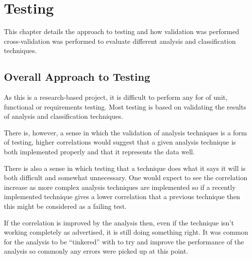 \chapter{Testing}



This chapter details the approach to testing and how validation was performed cross-validation was
performed to evaluate different analysis and classification techniques.

\section{Overall Approach to Testing}
As this is a research-based project, it is difficult to perform any for of unit, functional or 
requirements testing. Most testing is based on validating the results of analysis and 
classification techniques.

There is, however, a sense in which the validation of analysis techniques is a form of testing,
higher correlations would suggest that a given analysis technique is both implemented properly and
that it represents the data well.

There is also a sense in which testing that a technique does what it says it will is both 
difficult and somewhat unnecessary. One would expect to see the correlation increase as more
complex analysis techniques are implemented so if a recently implemented technique gives a lower
correlation that a previous technique then this might be considered as a failing test.

If the correlation is improved by the analysis then, even if the technique isn't working 
completely as advertised, it is still doing something right. It was common for the analysis to be
``tinkered'' with to try and improve the performance of the analysis so commonly any errors were
picked up at this point.

